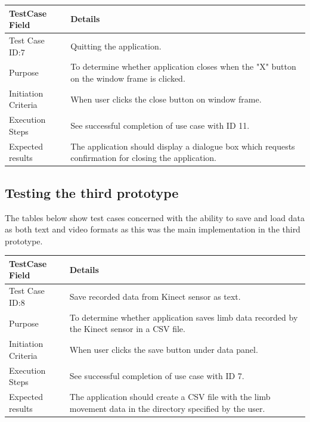 \documentclass[a4paper, 12pt]{article}
\begin{document}
\begin{table}[!htb]
 \begin{tabular}{|p{4cm}|p{10cm}|}
 \hline
  TestCase Field & Details \\
  \hline
   Test Case ID:7 & Quitting the application. \\
  \hline 
   Purpose & To determine whether application closes when the "X" button on the window frame is clicked. \\
  \hline
   Initiation Criteria & When user clicks the close button on window frame.  \\
  \hline
   Execution Steps & See successful completion of use case with ID 11.  \\
  \hline
   Expected results & The application should display a dialogue box which requests confirmation for closing the application. \\
  \hline
 \end{tabular}
\end{table}


\clearpage
\newpage

\subsection{Testing the third prototype}

The tables below show test cases concerned with the ability to save and load data as both text and video formats as this was the main implementation in the third prototype.


\begin{table}[!htb]
 \begin{tabular}{|p{4cm}|p{10cm}|}
 \hline
  TestCase Field & Details \\
  \hline
   Test Case ID:8 & Save recorded data from Kinect sensor as text. \\
  \hline 
   Purpose & To determine whether application saves limb data recorded by the Kinect sensor in a CSV file. \\
  \hline
   Initiation Criteria & When user clicks the save button under data panel.  \\
  \hline
   Execution Steps & See successful completion of use case with ID 7.  \\
  \hline
   Expected results & The application should create a CSV file with the limb movement data in the directory specified by the user. \\
  \hline
 \end{tabular}
\end{table}
\end{document}
